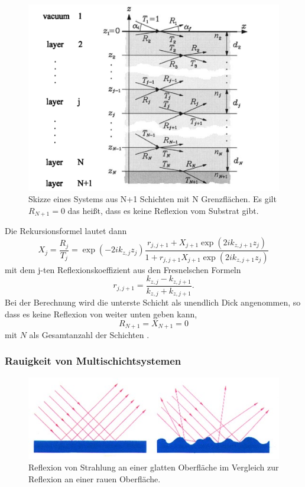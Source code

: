 \begin{figure}
    \includegraphics[width=\textwidth]{bilder/Multischichten.png}
    \caption{Skizze eines Systems aus N+1 Schichten mit N Grenzflächen. Es gilt $R_{N+1}=0$
    das heißt, dass es keine Reflexion vom Substrat gibt. \cite{Multischichten}}
    \label{fig:Abbildung3}
\end{figure}

Die Rekursionsformel lautet dann
\begin{equation}
    X_j=\frac{R_j}{T_j}=\exp(-2ik_{z,j}z_j)\frac{r_{j,j+1}+X_{j+1} \exp(2ik_{z,j+1}z_j)}{1+r_{j,j+1}X_{j+1} \exp(2ik_{z,j+1}z_j)}
    \label{eq:parratt}
\end{equation}
mit dem j-ten Reflexionskoeffizient aus den Fresnelschen Formeln
\begin{equation}
r_{j,j+1}=\frac{k_{z,j}-k_{z,j+1}}{k_{z,j}+k_{z,j+1}}.
\end{equation}
Bei der Berechnung wird die unterste Schicht als unendlich Dick angenommen, so dass es keine Reflexion von weiter unten geben kann, 
\begin{equation}
R_{N+1}=X_{N+1}=0 
\end{equation}
mit \(N\) als Gesamtanzahl der Schichten
\cite{Algorithmus}.

\subsubsection{Rauigkeit von Multischichtsystemen}

\begin{figure}
    \includegraphics[width=\textwidth]{bilder/Rauigkeit.jpg}
    \caption{Reflexion von Strahlung an einer glatten Oberfläche im Vergleich zur Reflexion an einer rauen Oberfläche. \cite{Oberflächen}
    }
    \label{fig:Abbildung4}
\end{figure}


